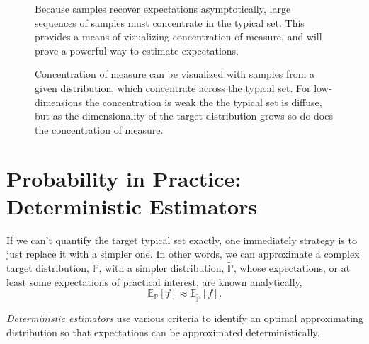 \documentclass[11pt, oneside]{article}
\newcommand{\PP}{ \mathbb{P} }
\newcommand{\EE}{ \mathbb{E} }
\begin{document}
\begin{figure*}
\caption{Because samples recover expectations asymptotically,
large sequences of samples must concentrate in the typical set.
This provides a means of visualizing concentration of measure,
and will prove a powerful way to estimate expectations.
}
\label{fig:samples}
\end{figure*}

\begin{figure*}
\centering
{}
\caption{Concentration of measure can be visualized with samples 
from a given distribution, which concentrate across the typical set.  
For low-dimensions the concentration is weak the the typical set 
is diffuse, but as the dimensionality of the target distribution grows
so do does the concentration of measure.
}
\label{fig:concentration_of_measure_emp}
\end{figure*}

\section{Probability in Practice: Deterministic Estimators}

If we can't quantify the target typical set exactly, one immediately
strategy is to just replace it with a simpler one.  In other words,
we can approximate a complex target distribution, $\PP$, with a 
simpler distribution, $\widetilde{\PP}$, whose expectations, or at 
least some expectations of practical interest, are known analytically,
%
\begin{equation*}
\EE_{\PP} \! \left[ f \right] 
\approx 
\EE_{\widetilde{\PP}} \! \left[ f \right].
\end{equation*}

\emph{Deterministic estimators} use various criteria to identify an 
optimal approximating distribution so that expectations can be 
approximated deterministically.
\end{document}
